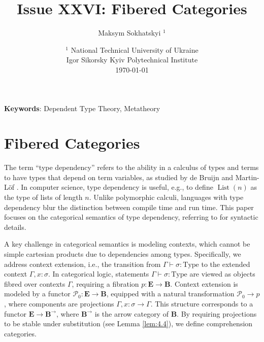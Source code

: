 \documentclass{article}
\begin{document}
\title{Issue XXVI: Fibered Categories}
\author{Maksym Sokhatskyi $^1$}
\date{ $^1$ National Technical University of Ukraine \\
       \small Igor Sikorsky Kyiv Polytechnical Institute \\
       \today }

\maketitle

\begin{abstract}
\end{abstract}

{\bf Keywords}: Dependent Type Theory, Metatheory

\ifincludeTOC
  \tableofcontents
\fi

\section{Fibered Categories}

The term ``type dependency'' refers to the ability in a calculus of types
and terms to have types that depend on term variables, as studied by
de Bruijn \cite{deBruijn1970} and Martin-L\"of \cite{MartinLof1984}.
In computer science, type dependency is useful, e.g., to
define $\operatorname{List}(n)$ as the type of lists of length $n$.
Unlike polymorphic calculi, languages with type dependency blur the
distinction between compile time and run time. This paper focuses on
the categorical semantics of type dependency, referring
to \cite{MartinLof1984, Troelstra1986} for syntactic details.

A key challenge in categorical semantics is modeling contexts,
which cannot be simple cartesian products due to dependencies among types.
Specifically, we address context extension, i.e., the transition
from $\Gamma \vdash \sigma : \text{Type}$ to the extended
context $\Gamma, x : \sigma$. In categorical logic,
statements $\Gamma \vdash \sigma : \text{Type}$ are viewed as
objects fibred over contexts $\Gamma$, requiring a
fibration $p : \mathbf{E} \to \mathbf{B}$. Context extension is
modeled by a functor $\mathscr{P}_0 : \mathbf{E} \to \mathbf{B}$,
equipped with a natural transformation $\mathscr{P}_0 \to p$,
where components are projections $\Gamma, x : \sigma \to \Gamma$.
This structure corresponds to a functor $\mathbf{E} \to \mathbf{B}^{\to}$,
where $\mathbf{B}^{\to}$ is the arrow category of $\mathbf{B}$.
By requiring projections to be stable under substitution (see
Lemma \ref{lem:4.4}), we define comprehension categories.
\end{document}
